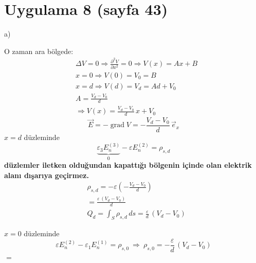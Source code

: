 \documentclass[11pt,a4paper]{article}
\begin{document}
\section{Uygulama 8 (sayfa 43)}
a)

O zaman ara bölgede:
\begin{align*}
&\Delta V=0\Rightarrow\frac{\partial^2V}{\partial x^2}=0\Rightarrow V(x)=Ax+B\\
&x=0\Rightarrow V(0)=V_0=B\\
&x=d\Rightarrow V(d)=V_d=Ad+V_0\\
&A=\frac{V_d-V_0}{d}\\
&\Rightarrow V(x)=\frac{V_d-V_0}{d}\,x+V_0
\end{align*}
\[ \vec E=-\operatorname{grad}V=-\frac{V_d-V_0}{d}\,\vec e_x \]
$x=d$ düzleminde
\[ \underbrace{\varepsilon_3E_n^{(3)}}_{0}-\varepsilon E_n^{(2)}=\rho_{s,d} \]
\textbf{düzlemler iletken olduğundan kapattığı bölgenin içinde olan elektrik alanı dışarıya geçirmez.}
\begin{align*}
&\rho_{s,d}=-\varepsilon\left(-\frac{V_d-V_0}{d}\right)\\
&=\frac{\varepsilon\,(V_d-V_0)}{d}\\
&Q_d=\int_S\rho_{s,d}\,ds=\frac{\varepsilon}{d}\,(V_d-V_0)
\end{align*}
\begin{center}
\end{center}
$x=0$ düzleminde
\[ \varepsilon E_n^{(2)}-\varepsilon_1E_n^{(1)}=\rho_{s,0}\ \Rightarrow\ \rho_{s,0}=-\frac{\varepsilon}{d}\,(V_d-V_0) \]
$=$ \okunamadi{}
\end{document}
